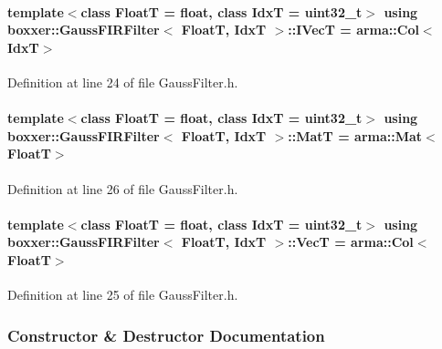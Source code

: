 \paragraph[{\texorpdfstring{I\+VecT}{IVecT}}]{\setlength{\rightskip}{0pt plus 5cm}template$<$class FloatT = float, class IdxT = uint32\+\_\+t$>$ using {\bf boxxer\+::\+Gauss\+F\+I\+R\+Filter}$<$ FloatT, IdxT $>$\+::{\bf I\+VecT} =  arma\+::\+Col$<$IdxT$>$}\hypertarget{classboxxer_1_1GaussFIRFilter_a0083c8c9ab6032dd458b4dc93852c2b8}{}\label{classboxxer_1_1GaussFIRFilter_a0083c8c9ab6032dd458b4dc93852c2b8}


Definition at line 24 of file Gauss\+Filter.\+h.

\paragraph[{\texorpdfstring{MatT}{MatT}}]{\setlength{\rightskip}{0pt plus 5cm}template$<$class FloatT = float, class IdxT = uint32\+\_\+t$>$ using {\bf boxxer\+::\+Gauss\+F\+I\+R\+Filter}$<$ FloatT, IdxT $>$\+::{\bf MatT} =  arma\+::\+Mat$<$FloatT$>$}\hypertarget{classboxxer_1_1GaussFIRFilter_a83cf4c7f4782f69918c0e0883fff5412}{}\label{classboxxer_1_1GaussFIRFilter_a83cf4c7f4782f69918c0e0883fff5412}


Definition at line 26 of file Gauss\+Filter.\+h.

\paragraph[{\texorpdfstring{VecT}{VecT}}]{\setlength{\rightskip}{0pt plus 5cm}template$<$class FloatT = float, class IdxT = uint32\+\_\+t$>$ using {\bf boxxer\+::\+Gauss\+F\+I\+R\+Filter}$<$ FloatT, IdxT $>$\+::{\bf VecT} =  arma\+::\+Col$<$FloatT$>$}\hypertarget{classboxxer_1_1GaussFIRFilter_aafe2049df690ad8c3617c39810e78bbe}{}\label{classboxxer_1_1GaussFIRFilter_aafe2049df690ad8c3617c39810e78bbe}


Definition at line 25 of file Gauss\+Filter.\+h.



\subsubsection{Constructor \& Destructor Documentation}
